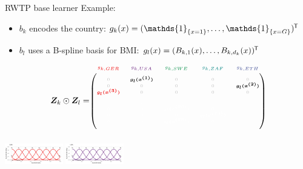 \documentclass[t,10pt]{beamer}
\begin{document}
\begin{frame}{RWTP base learner}
  Example:
  \begin{itemize}
    \item $b_k$ encodes the country: $g_k(x) = (\mathds{1}_{\{x = 1\}}, \dots, \mathds{1}_{\{x = G\}})^\tran$
    \item $b_l$ uses a B-spline basis for BMI: $g_l(x) = (B_{k,1}(x), \dots, B_{k,d_k}(x))^{\mkern-1.5mu\mathsf{T}}$
  \end{itemize}
  $$
    \design_k \odot \design_l = \tiny\begin{blockarray}{ccccc}
      \color[HTML]{EE0000}g_{k,GER} & \color[HTML]{631879}g_{k,USA} & \color[HTML]{008B45}g_{k,SWE} & \color[HTML]{008280}g_{k,ZAF} & \color[HTML]{3B4992}g_{k,ETH}\\
    \begin{block}{(ccccc)}
      \phantom{x}\\
      \color{lightgray}0 & \color{black}\bm{g_l(x^{(1)})} & \color{lightgray}0 & \color{lightgray}0 & \color{lightgray}0 \\
      \color{lightgray}0 & \color{lightgray}0 & \color{lightgray}0 & \color{lightgray}0 & \color{black}\bm{g_l(x^{(2)})} \\
      \color[HTML]{EE0000}\bm{g_l(x^{(3)})} & \color{lightgray}0 & \color{lightgray}0 & \color{lightgray}0 & \color{lightgray}0 \\
      \color{white}\vdots & \color{white}\vdots & \color{white}\vdots & \color{white}\vdots & \color{white}\vdots \\
      \color{white}0 & \color{white}0 & \color{white}\bm{g_l(x^{(73)})} & \color{white}0 & \color{white}0 \\
      \color{white}0 & \color{white}0 & \color{white}0 & \color{white}\bm{g_l(x^{(74)})} & \color{white}0 \\
      \color{white}0 & \color{white}0 & \color{white}\bm{g_l(x^{(75)})} & \color{white}0 & \color{white}0 \\
      \phantom{x}\\
    \end{block}
  \end{blockarray}
  $$
  \normalsize
  {\includegraphics[width=0.19\textwidth]{figures/fig-bs0-GER.png}}
  {\includegraphics[width=0.19\textwidth]{figures/fig-bs0-USA.png}}

\end{frame}
\end{document}
